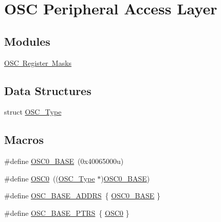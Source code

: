 \hypertarget{group___o_s_c___peripheral___access___layer}{}\section{O\+SC Peripheral Access Layer}
\label{group___o_s_c___peripheral___access___layer}
\subsection*{Modules}
\begin{DoxyCompactItemize}
\item 
\mbox{\hyperlink{group___o_s_c___register___masks}{O\+S\+C Register Masks}}
\end{DoxyCompactItemize}
\subsection*{Data Structures}
\begin{DoxyCompactItemize}
\item 
struct \mbox{\hyperlink{struct_o_s_c___type}{O\+S\+C\+\_\+\+Type}}
\end{DoxyCompactItemize}
\subsection*{Macros}
\begin{DoxyCompactItemize}
\item 
\#define \mbox{\hyperlink{group___o_s_c___peripheral___access___layer_ga66f87e82bb3e71235bf89df7149e7be7}{O\+S\+C0\+\_\+\+B\+A\+SE}}~(0x40065000u)
\item 
\#define \mbox{\hyperlink{group___o_s_c___peripheral___access___layer_gafcf06a8b76107b94e802b4db254e8bbc}{O\+S\+C0}}~((\mbox{\hyperlink{struct_o_s_c___type}{O\+S\+C\+\_\+\+Type}} $\ast$)\mbox{\hyperlink{group___o_s_c___peripheral___access___layer_ga66f87e82bb3e71235bf89df7149e7be7}{O\+S\+C0\+\_\+\+B\+A\+SE}})
\item 
\#define \mbox{\hyperlink{group___o_s_c___peripheral___access___layer_ga31b4aa65d54d63cd13bdf2915e86f31a}{O\+S\+C\+\_\+\+B\+A\+S\+E\+\_\+\+A\+D\+D\+RS}}~\{ \mbox{\hyperlink{group___o_s_c___peripheral___access___layer_ga66f87e82bb3e71235bf89df7149e7be7}{O\+S\+C0\+\_\+\+B\+A\+SE}} \}
\item 
\#define \mbox{\hyperlink{group___o_s_c___peripheral___access___layer_ga46f69fcb9d660e18b5cbf51adbbcec78}{O\+S\+C\+\_\+\+B\+A\+S\+E\+\_\+\+P\+T\+RS}}~\{ \mbox{\hyperlink{group___o_s_c___peripheral___access___layer_gafcf06a8b76107b94e802b4db254e8bbc}{O\+S\+C0}} \}
\end{DoxyCompactItemize}


